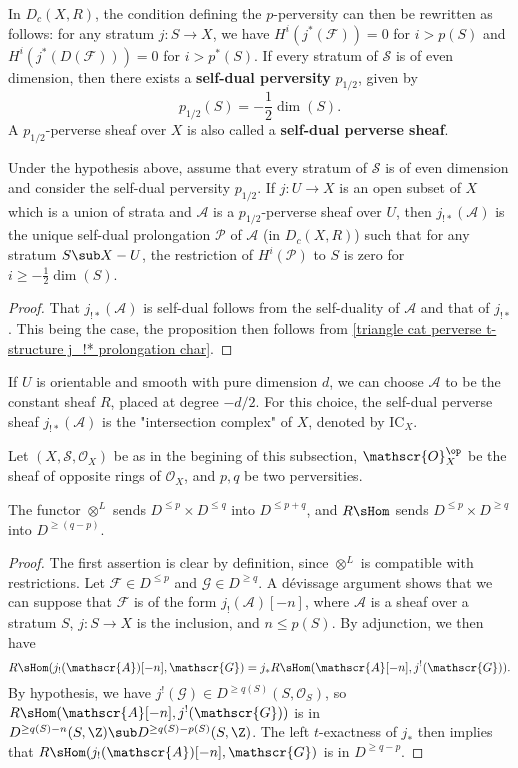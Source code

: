 In $D_c(X,R)$, the condition defining the $p$-perversity can then be rewritten as follows: for any stratum $j:S\to X$, we have $H^i(j^*(\mathscr{F}))=0$ for $i>p(S)$ and $H^i(j^*(D(\mathscr{F})))=0$ for $i>p^*(S)$. If every stratum of $\mathcal{S}$ is of even dimension, then there exists a \textbf{self-dual perversity} $p_{1/2}$, given by
\[p_{1/2}(S)=-\frac{1}{2}\dim(S).\]
A $p_{1/2}$-perverse sheaf over $X$ is also called a \textbf{self-dual perverse sheaf}.
\begin{proposition}\label{triangle cat constructible self-dual perverse prolongation char}
Under the hypothesis above, assume that every stratum of $\mathcal{S}$ is of even dimension and consider the self-dual perversity $p_{1/2}$. If $j:U\to X$ is an open subset of $X$ which is a union of strata and $\mathscr{A}$ is a $p_{1/2}$-perverse sheaf over $U$, then $j_{!*}(\mathscr{A})$ is the unique self-dual prolongation $\mathscr{P}$ of $\mathscr{A}$ (in $D_c(X,R)$) such that for any stratum $S\sub X-U$, the restriction of $H^i(\mathscr{P})$ to $S$ is zero for $i\geq-\frac{1}{2}\dim(S)$.  
\end{proposition}
\begin{proof}
That $j_{!*}(\mathscr{A})$ is self-dual follows from the self-duality of $\mathscr{A}$ and that of $j_{!*}$. This being the case, the proposition then follows from \cref{triangle cat perverse t-structure j_!* prolongation char}.
\end{proof}

\begin{remark}
If $U$ is orientable and smooth with pure dimension $d$, we can choose $\mathscr{A}$ to be the constant sheaf $R$, placed at degree $-d/2$. For this choice, the self-dual perverse sheaf $j_{!*}(\mathscr{A})$ is the "intersection complex" of $X$, denoted by $\mathrm{IC}_X$.
\end{remark}

Let $(X,\mathcal{S},\mathscr{O}_X)$ be as in the begining of this subsection, $\mathscr{O}_X^{\op}$ be the sheaf of opposite rings of $\mathscr{O}_X$, and $p,q$ be two perversities.
\begin{proposition}\label{triangle cat perverse structure and tensor Hom}
The functor $\otimes^L$ sends $D^{\leq p}\times D^{\leq q}$ into $D^{\leq p+q}$, and $R\sHom$ sends $D^{\leq p}\times D^{\geq q}$ into $D^{\geq (q-p)}$.
\end{proposition}
\begin{proof}
The first assertion is clear by definition, since $\otimes^L$ is compatible with restrictions. Let $\mathscr{F}\in D^{\leq p}$ and $\mathscr{G}\in D^{\geq q}$. A d\'evissage argument shows that we can suppose that $\mathscr{F}$ is of the form $j_!(\mathscr{A})[-n]$, where $\mathscr{A}$ is a sheaf over a stratum $S$, $j:S\to X$ is the inclusion, and $n\leq p(S)$. By adjunction, we then have
\[R\sHom(j_!(\mathscr{A})[-n],\mathscr{G})=j_*R\sHom(\mathscr{A}[-n],j^!(\mathscr{G})).\]
By hypothesis, we have $j^!(\mathscr{G})\in D^{\geq q(S)}(S,\mathscr{O}_S)$, so $R\sHom(\mathscr{A}[-n],j^!(\mathscr{G}))$ is in $D^{\geq q(S)-n}(S,\Z)\sub D^{\geq q(S)-p(S)}(S,\Z)$. The left $t$-exactness of $j_*$ then implies that $R\sHom(j_!(\mathscr{A})[-n],\mathscr{G})$ is in $D^{\geq q-p}$.
\end{proof}

